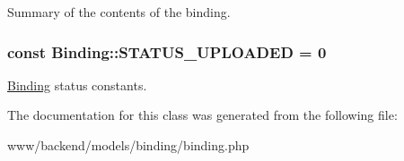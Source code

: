\label{classBinding_ae960edd7ba2a427c3853936f0e1a380e}
Summary of the contents of the binding. \hypertarget{classBinding_a501dc5e8d8952bcbd5d022a299c416fd}{
\subsubsection[{STATUS\_\-UPLOADED}]{\setlength{\rightskip}{0pt plus 5cm}const {\bf Binding::STATUS\_\-UPLOADED} = 0}}
\label{classBinding_a501dc5e8d8952bcbd5d022a299c416fd}
\hyperlink{classBinding}{Binding} status constants. 

The documentation for this class was generated from the following file:\begin{DoxyCompactItemize}
\item 
www/backend/models/binding/binding.php\end{DoxyCompactItemize}
